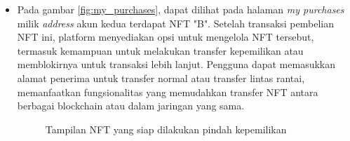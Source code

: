\begin{itemize}
  \item Pada gambar \ref*{fig:my_purchases}, dapat dilihat pada halaman \emph{my purchases} milik \emph{address} akun kedua terdapat NFT "B".  Setelah transaksi pembelian NFT ini, platform menyediakan opsi untuk mengelola NFT tersebut, termasuk kemampuan untuk melakukan transfer kepemilikan atau memblokirnya untuk transaksi lebih lanjut. Pengguna dapat memasukkan alamat penerima untuk transfer normal atau transfer lintas rantai, memanfaatkan fungsionalitas yang memudahkan transfer NFT antara berbagai blockchain atau dalam jaringan yang sama.
  
  \begin{figure} [H] \centering
    \caption{Tampilan NFT yang siap dilakukan pindah kepemilikan}
    \label{fig:normal_transfer}
    \end{figure}


\end{itemize}
